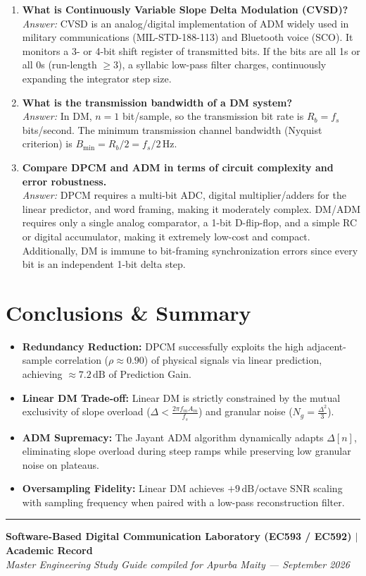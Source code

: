 \documentclass[11pt,a4paper]{article}
\begin{document}
\begin{enumerate}
    \item \textbf{What is Continuously Variable Slope Delta Modulation (CVSD)?}\\
    \textit{Answer:} CVSD is an analog/digital implementation of ADM widely used in military communications (MIL-STD-188-113) and Bluetooth voice (SCO). It monitors a 3- or 4-bit shift register of transmitted bits. If the bits are all 1s or all 0s (run-length $\ge 3$), a syllabic low-pass filter charges, continuously expanding the integrator step size.

    \item \textbf{What is the transmission bandwidth of a DM system?}\\
    \textit{Answer:} In DM, $n = 1$ bit/sample, so the transmission bit rate is $R_b = f_s$ bits/second. The minimum transmission channel bandwidth (Nyquist criterion) is $B_{\min} = R_b / 2 = f_s / 2\,\mathrm{Hz}$.

    \item \textbf{Compare DPCM and ADM in terms of circuit complexity and error robustness.}\\
    \textit{Answer:} DPCM requires a multi-bit ADC, digital multiplier/adders for the linear predictor, and word framing, making it moderately complex. DM/ADM requires only a single analog comparator, a 1-bit D-flip-flop, and a simple RC or digital accumulator, making it extremely low-cost and compact. Additionally, DM is immune to bit-framing synchronization errors since every bit is an independent 1-bit delta step.
\end{enumerate}

\section{Conclusions \& Summary}
\begin{itemize}
    \item \textbf{Redundancy Reduction:} DPCM successfully exploits the high adjacent-sample correlation ($\rho \approx 0.90$) of physical signals via linear prediction, achieving $\approx 7.2\,\mathrm{dB}$ of Prediction Gain.
    \item \textbf{Linear DM Trade-off:} Linear DM is strictly constrained by the mutual exclusivity of slope overload ($\Delta < \frac{2\pi f_m A_m}{f_s}$) and granular noise ($N_g = \frac{\Delta^2}{3}$).
    \item \textbf{ADM Supremacy:} The Jayant ADM algorithm dynamically adapts $\Delta[n]$, eliminating slope overload during steep ramps while preserving low granular noise on plateaus.
    \item \textbf{Oversampling Fidelity:} Linear DM achieves $+9\,\mathrm{dB/octave}$ SNR scaling with sampling frequency when paired with a low-pass reconstruction filter.
\end{itemize}

\vspace{5mm}
\noindent\rule{\linewidth}{0.6pt}
\begin{center}
\small \textbf{Software-Based Digital Communication Laboratory (EC593 / EC592) \quad $\vert$ \quad Academic Record}\\
\textit{Master Engineering Study Guide compiled for Apurba Maity --- September 2026}
\end{center}
\end{document}
